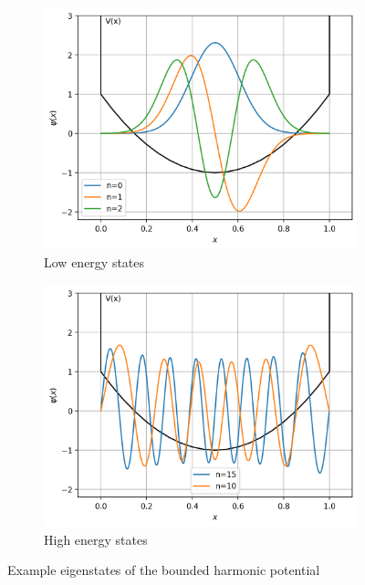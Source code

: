 \documentclass[11pt]{article}
\begin{document}
\begin{figure}[!h]
  \begin{subfigure}{0.5\textwidth}
    \centering
    \includegraphics[width=\linewidth]{ex_eigenstates2.png}
    \caption{Low energy states}
  \end{subfigure}%
  \begin{subfigure}{0.5\textwidth}
    \centering
    \includegraphics[width=\linewidth]{ex_eigenstates3.png}
    \caption{High energy states}
  \end{subfigure}
  \caption{Example eigenstates of the bounded harmonic potential}
\end{figure}
\end{document}
